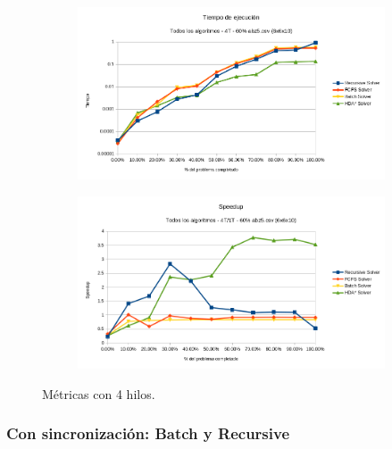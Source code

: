 \begin{figure}[h]
    \begin{subfigure}{.5\textwidth}
        \begin{center}
            \includegraphics[width=\textwidth]{Media/Ch2/Runtime_All_Algorithms_4.png}
        \end{center}
    \end{subfigure}
    \begin{subfigure}{.5\textwidth}
        \begin{center}
            \includegraphics[width=\textwidth]{Media/Ch2/Speedup_All_Algorithms_4.png}
        \end{center}
    \end{subfigure}
    \caption{Métricas con 4 hilos.}
    \label{fig:Metricas4Thread}
\end{figure}

\pagebreak
\subsubsection{Con sincronización: Batch y Recursive}

